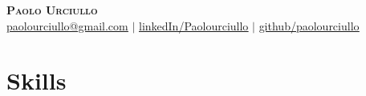 \documentclass[]{resume-openfont}
\begin{document}
\newcommand{\yourName}{Paolo Urciullo}
\newcommand{\yourWebsite}{https://paolourciullo.com}
\newcommand{\yourEmail}{paolourciullo@gmail.com}
\newcommand{\githubUserName}{paolourciullo}
\newcommand{\linkedInUserName}{Paolourciullo}


\begin{center}
    \textbf{\Huge \scshape \yourName} \\ \vspace{1pt}
    \small   \href{mailto:\yourEmail}{\underline{\yourEmail}} $|$ 
    \href{https://linkedin.com/in/\linkedInUserName}{\underline{linkedIn/\linkedInUserName}} $|$
    \href{https://github.com/\githubUserName}{\underline{github/\githubUserName}}
\end{center}



\section{Skills}
\begin{resumeSkillList}
    \\
    \\
\end{resumeSkillList}
\end{document}
